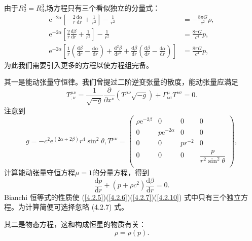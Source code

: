 \documentclass[11pt, a4paper, oneside, onecolumn]{ctexart}
\numberwithin{equation}{subsection}
\begin{document}
由于$R^{2}_{2}=R^{3}_{3}$,场方程只有三个看似独立的分量式：
\begin{align}
\mathrm{e}^{-2\alpha}\left[-\frac{2}{r}\frac{\mathrm{d}\alpha}{\mathrm{d}r}+\frac{1}{r^{2}}\right]-\frac{1}{r^{2}}&=-\frac{8\pi G}{c^{2}}\rho,\label{4.2.5}\\
\mathrm{e}^{-2\alpha}\left[\frac{2}{r}\frac{\mathrm{d}\beta}{\mathrm{d}r}+\frac{1}{r^{2}}\right]-\frac{1}{r^{2}}&=\frac{8\pi G}{c^{4}}p,\label{4.2.6}\\
\mathrm{e}^{-2\alpha}\left[\frac{1}{r}\left(\frac{\mathrm{d}\beta}{\mathrm{d}r}-\frac{\mathrm{d}\alpha}{\mathrm{d}r}\right)+\frac{\mathrm{d}^{2}\beta}{\mathrm{d}r^{2}}+\frac{\mathrm{d}\beta}{\mathrm{d}r}\left(\frac{\mathrm{d}\beta}{\mathrm{d}r}-\frac{\mathrm{d}\alpha}{\mathrm{d}r}\right)\right]&=\frac{8\pi G}{c^{4}}p,\label{4.2.7}
\end{align}
为此我们需要引入更多的方程以使方程组完备。

其一是能动张量守恒律。我们曾提过二阶逆变张量的散度，能动张量应满足
\begin{equation}
T^{\mu\nu}_{;\nu}=\frac{1}{\sqrt{-g}}\frac{\partial{}}{\partial{}x^{\nu}}\left(T^{\mu\nu}\sqrt{-g}\right)+\Gamma^{\mu}_{\nu\sigma}T^{\nu\sigma}=0.
\end{equation}
注意到
\begin{equation}
g=-c^{2}\mathrm{e}^{\left(2\alpha+2\beta\right)}r^{4}\sin^{2}\theta,T^{\mu\nu}=
\begin{pmatrix}
\rho \mathrm{e}^{-2\beta} & 0 & 0 & 0\\
0 & p\mathrm{e}^{-2\alpha} & 0 & 0\\
0 & 0 & pr^{-2} & 0\\
0 & 0 & 0 & \dfrac{p}{r^{2}\sin^{2}\theta}\\
\end{pmatrix},
\end{equation}
计算能动张量守恒方程$\mu=1$的分量方程，得到
\begin{equation}
\frac{\mathrm{d}p}{\mathrm{d}r}+\left(p+\rho c^{2}\right)\frac{\mathrm{d}\beta}{\mathrm{d}r}=0.\label{4.2.10}
\end{equation}
Bianchi 恒等式的性质使 (\ref{4.2.5})(\ref{4.2.6})(\ref{4.2.7})(\ref{4.2.10}) 式中只有三个独立方程。为计算简便可选择忽略 (4.2.7) 式。

其二是物态方程，这和构成恒星的物质有关：
\begin{equation}
\rho=\rho\left(p\right).
\end{equation}
\end{document}
